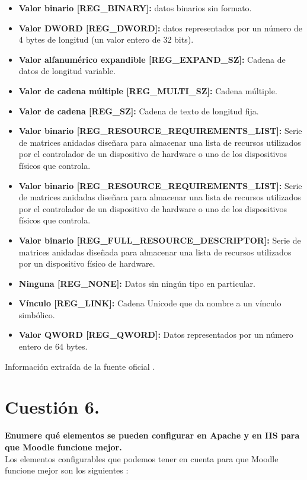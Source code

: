 \documentclass[a4paper, 10pt]{article} %
\begin{document}
\begin{itemize}
    \item \textbf{Valor binario [REG\_BINARY]:} datos binarios sin formato.
    \item \textbf{Valor DWORD [REG\_DWORD]:} datos representados por un número de 4 bytes de longitud (un valor entero de 32 bits).
    \item \textbf{Valor alfanumérico expandible [REG\_EXPAND\_SZ]:} Cadena de datos de longitud variable.
    \item \textbf{Valor de cadena múltiple [REG\_MULTI\_SZ]:} Cadena múltiple.
    \item \textbf{Valor de cadena [REG\_SZ]:} Cadena de texto de longitud fija.
    \item \textbf{Valor binario [REG\_RESOURCE\_REQUIREMENTS\_LIST]:} Serie de matrices anidadas diseñara para almacenar una lista de recursos utilizados por el controlador de un dispositivo de hardware o uno de los dispositivos físicos que controla.
    \item \textbf{Valor binario [REG\_RESOURCE\_REQUIREMENTS\_LIST]:} Serie de matrices anidadas diseñara para almacenar una lista de recursos utilizados por el controlador de un dispositivo de hardware o uno de los dispositivos físicos que controla.
    \item \textbf{Valor binario [REG\_FULL\_RESOURCE\_DESCRIPTOR]:} Serie de matrices anidadas diseñada para almacenar una lista de recursos utilizados por un dispositivo físico de hardware.
    \item \textbf{Ninguna [REG\_NONE]:} Datos sin ningún tipo en particular.
    \item \textbf{Vínculo [REG\_LINK]:} Cadena Unicode que da nombre a un vínculo simbólico.
    \item \textbf{Valor QWORD [REG\_QWORD]:} Datos representados por un número entero de 64 bytes.
\end{itemize}
Información extraída de la fuente oficial \cite{5}.

\pagebreak

\section{Cuestión 6.}
\textbf{Enumere qué elementos se pueden configurar en Apache y en IIS para que Moodle funcione mejor.}\\

Los elementos configurables que podemos tener en cuenta para que Moodle funcione mejor son los siguientes \cite{6}:
\end{document}
